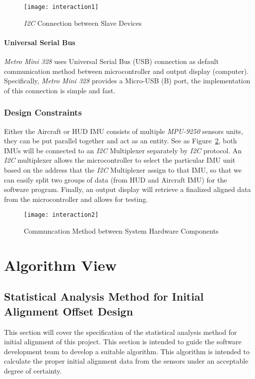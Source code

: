 		\begin{figure}
			\centering
		 		\caption{\textit{I2C} Connection between Slave Devices}			
		      	\texttt{[image: interaction1]}
		    \label{fig:interaction1}
		\end{figure}

		\paragraph{Universal Serial Bus}
		\textit{Metro Mini 328} uses Universal Serial Bus (USB) connection as default communication method between microcontroller and output display (computer). Specifically, \textit{Metro Mini 328} provides a Micro-USB (B) port, the implementation of this connection is simple and fast.\\

	\subsubsection{Design Constraints}
	Either the Aircraft or HUD IMU consists of multiple \textit{MPU-9250} sensors units, they can be put parallel together and act as an entity. See as Figure~\ref{fig:interaction2}, both IMUs will be connected to an \textit{I2C} Multiplexer separately by \textit{I2C} protocol. An \textit{I2C}  multiplexer allows the microcontroller to select the particular IMU unit based on the address that the \textit{I2C} Multiplexer assign to that IMU, so that we can easily split two groups of data (from HUD and Aircraft IMU) for the software program. Finally, an output display will retrieve a finalized aligned data from the microcontroller and allows for testing.

	\begin{figure}
		\centering
	 		\caption{Communcation Method between System Hardware Components \cite{i2c-2}}			
	      	\texttt{[image: interaction2]}
	    \label{fig:interaction2}
	\end{figure}



\section{Algorithm View}
	\subsection{Statistical Analysis Method for Initial Alignment Offset Design}
	This section will cover the specification of the statistical analysis method for initial alignment of this project. This section is intended to guide the software development team to develop a suitable algorithm. This algorithm is intended to calculate the proper initial alignment data from the sensors under an acceptable degree of certainty.\\  

